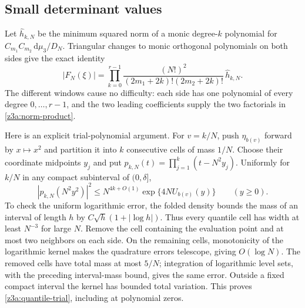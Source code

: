 \documentclass[11pt]{article}
\theoremstyle{definition}\newtheorem{definition}[theorem]{Definition}
\theoremstyle{remark}\newtheorem{remark}[theorem]{Remark}
\begin{document}
\subsection{Small determinant values}

Let $\widehat h_{k,N}$ be the minimum squared norm of a monic degree-$k$
polynomial for $C_{m_1}C_{m_2}\,\mathrm d\mu_3/D_N$.  Triangular changes to
monic orthogonal polynomials on both sides give the exact identity
\begin{equation}\label{z3a:norm-product}
 |F_N(\xi)|=\prod_{k=0}^{r-1}
 \frac{(N!)^2}{(2m_1+2k)!(2m_2+2k)!}\,\widehat h_{k,N}.
\end{equation}
The different windows cause no difficulty: each side has one polynomial
of every degree $0,\ldots,r-1$, and the two leading coefficients supply
the two factorials in \eqref{z3a:norm-product}.

Here is an explicit trial-polynomial argument.  For $v=k/N$, push $\eta_{b(v)}$
forward by $x\mapsto x^2$ and partition it into $k$ consecutive cells of
mass $1/N$.  Choose their coordinate midpoints $y_j$ and put
$p_{k,N}(t)=\prod_{j=1}^k(t-N^2y_j)$.  Uniformly for $k/N$ in any compact
subinterval of $(0,\delta]$,
\begin{equation}\label{z3a:quantile-trial}
 |p_{k,N}(N^2y^2)|^2
 \le N^{4k+O(1)}\exp\{4NU_{b(v)}(y)\}\qquad(y\ge0).
\end{equation}
To check the uniform logarithmic error, the folded density bounds the
mass of an interval of length $h$ by $C\sqrt h(1+|\log h|)$.  Thus every
quantile cell has width at least $N^{-3}$ for large $N$.  Remove the cell
containing the evaluation point and at most two neighbors on each side.
On the remaining cells, monotonicity of the logarithmic kernel makes the
quadrature errors telescope, giving $O(\log N)$.  The removed cells have
total mass at most $5/N$; integration of logarithmic level sets, with
the preceding interval-mass bound, gives the same error.  Outside a fixed
compact interval the kernel has bounded total variation.  This proves
\eqref{z3a:quantile-trial}, including at polynomial zeros.
\end{document}
